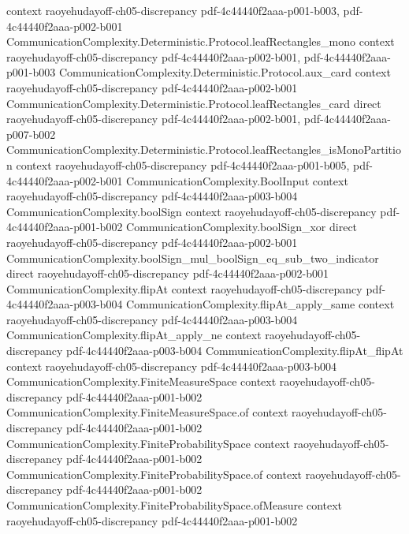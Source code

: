 \begin{theorem}
  {context}
  {raoyehudayoff-ch05-discrepancy}
  {pdf-4c44440f2aaa-p001-b003,
    pdf-4c44440f2aaa-p002-b001}
\proofstep
  {CommunicationComplexity.Deterministic.Protocol.leafRectangles_mono}
  {context}
  {raoyehudayoff-ch05-discrepancy}
  {pdf-4c44440f2aaa-p002-b001,
    pdf-4c44440f2aaa-p001-b003}
\proofstep
  {CommunicationComplexity.Deterministic.Protocol.aux_card}
  {context}
  {raoyehudayoff-ch05-discrepancy}
  {pdf-4c44440f2aaa-p002-b001}
\proofstep
  {CommunicationComplexity.Deterministic.Protocol.leafRectangles_card}
  {direct}
  {raoyehudayoff-ch05-discrepancy}
  {pdf-4c44440f2aaa-p002-b001,
    pdf-4c44440f2aaa-p007-b002}
\proofstep
  {CommunicationComplexity.Deterministic.Protocol.leafRectangles_isMonoPartition}
  {context}
  {raoyehudayoff-ch05-discrepancy}
  {pdf-4c44440f2aaa-p001-b005,
    pdf-4c44440f2aaa-p002-b001}
\proofstep
  {CommunicationComplexity.BoolInput}
  {context}
  {raoyehudayoff-ch05-discrepancy}
  {pdf-4c44440f2aaa-p003-b004}
\proofstep
  {CommunicationComplexity.boolSign}
  {context}
  {raoyehudayoff-ch05-discrepancy}
  {pdf-4c44440f2aaa-p001-b002}
\proofstep
  {CommunicationComplexity.boolSign_xor}
  {direct}
  {raoyehudayoff-ch05-discrepancy}
  {pdf-4c44440f2aaa-p002-b001}
\proofstep
  {CommunicationComplexity.boolSign_mul_boolSign_eq_sub_two_indicator}
  {direct}
  {raoyehudayoff-ch05-discrepancy}
  {pdf-4c44440f2aaa-p002-b001}
\proofstep
  {CommunicationComplexity.flipAt}
  {context}
  {raoyehudayoff-ch05-discrepancy}
  {pdf-4c44440f2aaa-p003-b004}
\proofstep
  {CommunicationComplexity.flipAt_apply_same}
  {context}
  {raoyehudayoff-ch05-discrepancy}
  {pdf-4c44440f2aaa-p003-b004}
\proofstep
  {CommunicationComplexity.flipAt_apply_ne}
  {context}
  {raoyehudayoff-ch05-discrepancy}
  {pdf-4c44440f2aaa-p003-b004}
\proofstep
  {CommunicationComplexity.flipAt_flipAt}
  {context}
  {raoyehudayoff-ch05-discrepancy}
  {pdf-4c44440f2aaa-p003-b004}
\proofstep
  {CommunicationComplexity.FiniteMeasureSpace}
  {context}
  {raoyehudayoff-ch05-discrepancy}
  {pdf-4c44440f2aaa-p001-b002}
\proofstep
  {CommunicationComplexity.FiniteMeasureSpace.of}
  {context}
  {raoyehudayoff-ch05-discrepancy}
  {pdf-4c44440f2aaa-p001-b002}
\proofstep
  {CommunicationComplexity.FiniteProbabilitySpace}
  {context}
  {raoyehudayoff-ch05-discrepancy}
  {pdf-4c44440f2aaa-p001-b002}
\proofstep
  {CommunicationComplexity.FiniteProbabilitySpace.of}
  {context}
  {raoyehudayoff-ch05-discrepancy}
  {pdf-4c44440f2aaa-p001-b002}
\proofstep
  {CommunicationComplexity.FiniteProbabilitySpace.ofMeasure}
  {context}
  {raoyehudayoff-ch05-discrepancy}
  {pdf-4c44440f2aaa-p001-b002}

\end{theorem}
